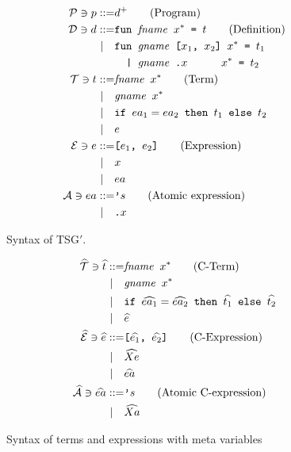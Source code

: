 \documentclass[10pt]{../sigplanconf}
\begin{document}
\begin{figure}\centering
  \begin{align*}
    \mathcal{P} \ni p ::= & d^{+}\tag{Program}\\
    \mathcal{D} \ni d ::= &\texttt{fun \textit{\rmfamily fname} $x^{*}$ = $t$}  \tag{Definition} \\
    | \quad &\texttt{fun \textit{\rmfamily gname} [$x_1$, $x_2$] $x^{*}$ = $t_1$} \\
    & \texttt{\ \ | \textit{\rmfamily gname}\ \texttt{.}$x$ \hspace{.7cm} $x^{*}$ = $t_2$}\\
    \mathcal{T} \ni t ::= & \texttt{\textit{\rmfamily fname} $x^{*}$}  \tag{Term}\\
    | \quad & \texttt{\textit{\rmfamily gname} $x^{*}$} \\
    | \quad & \texttt{if $ea_1 = ea_2$ then $t_1$ else $t_2$} \\
    | \quad & e \\
    \mathcal{E} \ni e ::= & \texttt{[$e_1$, $e_2$]} \tag{Expression}\\
    | \quad & x \\
    | \quad & ea \\
    \mathcal{A} \ni ea ::= & \texttt{'}s \tag{Atomic expression}\\
    | \quad & \texttt{.}x
  \end{align*}
  \caption{Syntax of TSG$'$.}
\label{fig:bnf}
\end{figure}

\begin{figure}\centering
  \begin{align*}
    \widehat{\mathcal{T}} \ni \widehat{t}
      ::=& \texttt{\textit{\rmfamily fname} $x^{*}$} \tag{C-Term} \\
    | \quad & \texttt{\textit{\rmfamily gname} $x^{*}$} \\
    | \quad & \texttt{if $\widehat{ea_1} = \widehat{ea_2}$ then $\widehat{t_1}$ else $\widehat{t_2}$} \\
    | \quad & \widehat{e} \\
    \widehat{\mathcal{E}} \ni \widehat{e} ::=& \texttt{[$\widehat{e_1}$, $\widehat{e_2}$]} \tag{C-Expression} \\
    | \quad & \widehat{Xe} \\
    | \quad & \widehat{ea} \\
    \widehat{\mathcal{A}} \ni \widehat{ea} ::= & \texttt{'}s \tag{Atomic C-expression} \\
    | \quad & \widehat{Xa}
  \end{align*}

\caption{Syntax of terms and expressions with meta variables}
\label{fig:cbnf}
\end{figure}
\end{document}

